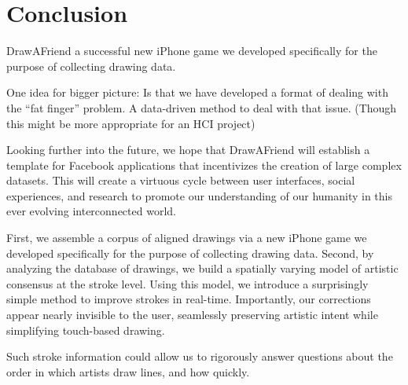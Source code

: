 \section{Conclusion}

DrawAFriend
a successful new iPhone game we developed specifically for the
purpose of collecting drawing data.

One idea for bigger picture: Is that we have developed a format of dealing with the ``fat finger'' problem. A data-driven method to deal with that issue. (Though this might be more appropriate for an HCI project)

Looking further into the future, we hope that DrawAFriend will establish a template for Facebook applications that incentivizes the creation of large complex datasets. This will create a virtuous cycle between user interfaces, social experiences, and research to promote our understanding of our humanity in this ever evolving interconnected world.

First, we assemble a corpus of aligned drawings via a new iPhone
game we developed specifically for the purpose of collecting drawing
data. Second, by analyzing the database of drawings, we build a
spatially varying model of artistic consensus at the stroke level.
Using this model, we introduce a surprisingly simple method to
improve strokes in real-time. Importantly, our corrections appear
nearly invisible to the user, seamlessly preserving artistic intent
while simplifying touch-based drawing.

Such stroke
information could allow us to rigorously answer questions about the
order in which artists draw lines, and how quickly.
